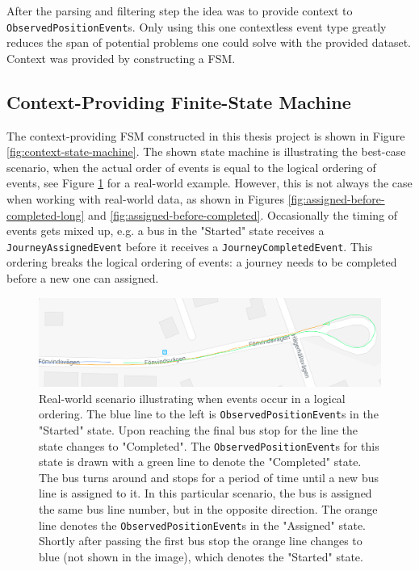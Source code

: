After the parsing and filtering step the idea was to provide context to \texttt{ObservedPositionEvent}s.
Only using this one contextless event type greatly reduces the span of potential problems one could solve with the provided dataset.
Context was provided by constructing a FSM.

\subsection{Context-Providing Finite-State Machine}
The context-providing FSM constructed in this thesis project is shown in Figure \ref{fig:context-state-machine}.
The shown state machine is illustrating the best-case scenario, when the actual order of events is equal to the logical ordering of events, see Figure \ref{fig:assigned-before-completed-working} for a real-world example.
However, this is not always the case when working with real-world data, as shown in Figures \ref{fig:assigned-before-completed-long} and \ref{fig:assigned-before-completed}.
Occasionally the timing of events gets mixed up, e.g. a bus in the "Started" state receives a \texttt{JourneyAssignedEvent} before it receives a \texttt{JourneyCompletedEvent}.
This ordering breaks the logical ordering of events: a journey needs to be completed before a new one can assigned.

\begin{figure}[h!]
    \centering
    \includegraphics[width=1\textwidth]{figures/assigned_completed_working}
    \caption{Real-world scenario illustrating when events occur in a logical ordering.
    The blue line to the left is \texttt{ObservedPositionEvent}s in the "Started" state.
    Upon reaching the final bus stop for the line the state changes to "Completed".
    The \texttt{ObservedPositionEvent}s for this state is drawn with a green line to denote the "Completed" state.
    The bus turns around and stops for a period of time until a new bus line is assigned to it.
    In this particular scenario, the bus is assigned the same bus line number, but in the opposite direction.
    The orange line denotes the \texttt{ObservedPositionEvent}s in the "Assigned" state.
    Shortly after passing the first bus stop the orange line changes to blue (not shown in the image), which denotes the "Started" state.}
    \label{fig:assigned-before-completed-working}
\end{figure}

